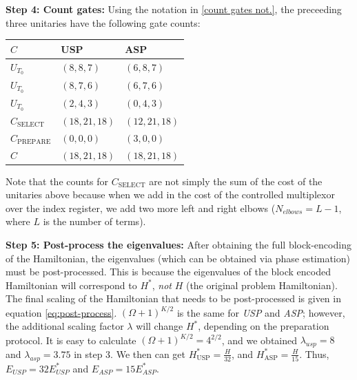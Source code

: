 \textbf{Step 4: Count gates:} Using the notation in \ref{count gates not.}, the preceeding three unitaries have the following gate counts:

\begin{center}
    \begin{tabular}{ |p{3cm}||p{3cm}|p{3cm}|}
        \hline
        $C$& USP &ASP\\
        \hline
        $U_{T_0}$   & $(8, 8, 7)$    &$(6, 8, 7)$\\
        $U_{T_0}$   & $(8, 7, 6)$    &$(6, 7, 6)$\\
        $U_{T_0}$   & $(2, 4, 3)$    &$(0, 4, 3)$\\
        \hline
        $C_{\text{SELECT}}$ & $(18, 21, 18)$ &$(12, 21, 18)$\\
        $C_{\text{PREPARE}}$ & $(0, 0, 0)$ &$(3, 0, 0)$\\
        \hline
        $C$ & $(18, 21, 18)$& $(18, 21, 18)$\\
        \hline
       \end{tabular}
\end{center}

Note that the counts for $C_{\text{SELECT}}$ are not simply the sum of the cost of the unitaries above because when we add in the cost of the controlled multiplexor over the index register, we add two more left and right elbows ($N_{elbows} = L - 1$, where $L$ is the number of terms). 

\textbf{Step 5: Post-process the eigenvalues:} After obtaining the full block-encoding of the Hamiltonian, the eigenvalues (which can be obtained via phase estimation) must be post-processed. This is because the eigenvalues of the block encoded Hamiltonian will correspond to $H^*$, \textit{not} $H$ (the original problem Hamiltonian).
The final scaling of the Hamiltonian that needs to be post-processed is given in equation \ref{eq:post-process}. $(\Omega + 1)^{K / 2}$ is the same for \textit{USP} and \textit{ASP}; however, the additional scaling factor $\lambda$ will change $H^*$, depending on the preparation protocol. It is easy to calculate $(\Omega + 1)^{K/2} = 4^{2/2}$, and we obtained $\lambda_{usp} = 8$ and $\lambda_{asp} = 3.75$ in step 3. 
We then can get $H^*_{\text{USP}} = \frac{H}{32}$, and $H^*_{\text{ASP}} = \frac{H}{15}$. Thus, $E_{USP} = 32E^*_{USP}$ and $E_{ASP} = 15E^*_{ASP}$.